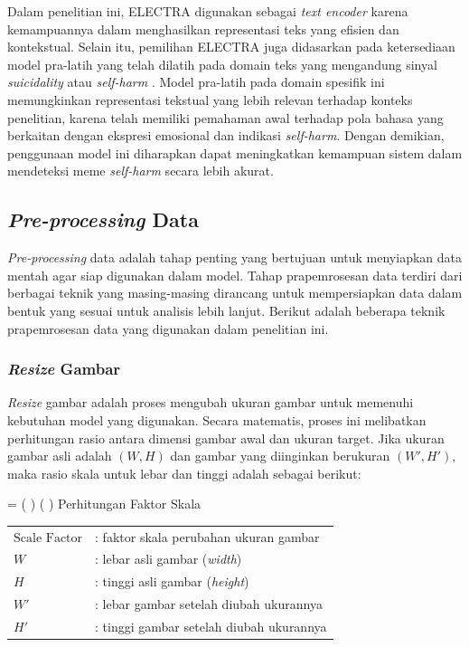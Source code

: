 Dalam penelitian ini, ELECTRA digunakan sebagai \textit{text encoder} karena kemampuannya dalam menghasilkan representasi teks yang efisien dan kontekstual. 
Selain itu, pemilihan ELECTRA juga didasarkan pada ketersediaan model pra-latih yang telah dilatih pada domain teks yang mengandung sinyal \textit{suicidality} atau \textit{self-harm} \cite{sentinet_suicidality}. Model pra-latih pada domain spesifik ini memungkinkan representasi tekstual yang lebih relevan terhadap konteks penelitian, karena telah memiliki pemahaman awal terhadap pola bahasa yang berkaitan dengan ekspresi emosional dan indikasi \textit{self-harm}. Dengan demikian, penggunaan model ini diharapkan dapat meningkatkan kemampuan sistem dalam mendeteksi meme \textit{self-harm} secara lebih akurat.


\subsection{\textit{Pre-processing} Data} \label{II.teori11}
\textit{Pre-processing} data adalah tahap penting  yang bertujuan untuk menyiapkan data mentah agar siap digunakan dalam model. Tahap prapemrosesan data terdiri dari berbagai teknik yang masing-masing dirancang untuk mempersiapkan data dalam bentuk yang sesuai untuk analisis lebih lanjut. Berikut adalah beberapa teknik prapemrosesan data yang digunakan dalam penelitian ini.


\subsubsection{\textit{Resize} Gambar} \label{II.teori11.1}
\textit{Resize} gambar adalah proses mengubah ukuran gambar untuk memenuhi kebutuhan model yang digunakan. Secara matematis, proses ini melibatkan perhitungan rasio antara dimensi gambar awal dan ukuran target. Jika ukuran gambar asli adalah $(W, H)$ dan gambar yang diinginkan berukuran $(W', H')$, maka rasio skala untuk lebar dan tinggi adalah sebagai berikut: 
\\

\begin{equationcaptioned}{
	 = \left(  \right) \left(  \right)
}{
Perhitungan Faktor Skala
}
\end{equationcaptioned}

\noindent
{}

\begin{tabular}{l l}
$\text{Scale Factor}$ & : faktor skala perubahan ukuran gambar \\ 
$W$ & : lebar asli gambar (\textit{width}) \\ 
$H$ & : tinggi asli gambar (\textit{height}) \\ 
$W'$ & : lebar gambar setelah diubah ukurannya \\ 
$H'$ & : tinggi gambar setelah diubah ukurannya \\ 

\end{tabular} \\


